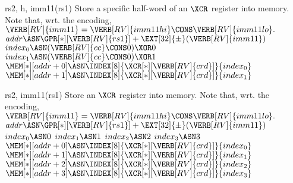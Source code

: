 
 {rs2, h,    imm11(rs1)}{
  Store a specific half-word of an $\XCR$ register into memory.
  Note that, wrt. the encoding,
  $
  \VERB[RV]{imm11} = \VERB[RV]{imm11hi} \CONS \VERB[RV]{imm11lo} .
  $
}{
  $addr            \ASN \GPR[*][{\VERB[RV]{rs1}}] + \EXT[32]{\pm}( \VERB[RV]{imm11} )$ \;
  $index_0         \ASN ( \VERB[RV]{cc} \CONS             0 ) \XOR 0$ \;
  $index_1         \ASN ( \VERB[RV]{cc} \CONS             0 ) \XOR 1$ \;
  $\MEM[*][addr+0] \ASN \INDEX[8]{\XCR[*][{\VERB[RV]{crd}}]}{index_0}$ \;
  $\MEM[*][addr+1] \ASN \INDEX[8]{\XCR[*][{\VERB[RV]{crd}}]}{index_1}$ \;
}


 {rs2,       imm11(rs1)}{
  Store                         an $\XCR$ register into memory.
  Note that, wrt. the encoding,
  $
  \VERB[RV]{imm11} = \VERB[RV]{imm11hi} \CONS \VERB[RV]{imm11lo} .
  $
}{
  $addr            \ASN \GPR[*][{\VERB[RV]{rs1}}] + \EXT[32]{\pm}( \VERB[RV]{imm11} )$ \;
  $index_0         \ASN                                            0$ \;
  $index_1         \ASN                                            1$ \;
  $index_2         \ASN                                            2$ \;
  $index_3         \ASN                                            3$ \;
  $\MEM[*][addr+0] \ASN \INDEX[8]{\XCR[*][{\VERB[RV]{crd}}]}{index_0}$ \;
  $\MEM[*][addr+1] \ASN \INDEX[8]{\XCR[*][{\VERB[RV]{crd}}]}{index_1}$ \;
  $\MEM[*][addr+2] \ASN \INDEX[8]{\XCR[*][{\VERB[RV]{crd}}]}{index_2}$ \;
  $\MEM[*][addr+3] \ASN \INDEX[8]{\XCR[*][{\VERB[RV]{crd}}]}{index_3}$ \;
}



